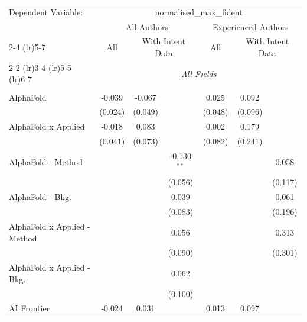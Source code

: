 \begingroup
\centering
\begin{tabular}{lcccccc}
   \tabularnewline \midrule \midrule
   Dependent Variable: & \multicolumn{6}{c}{normalised\_max\_fident}\\
 & \multicolumn{3}{c}{All Authors} & \multicolumn{3}{c}{Experienced Authors} \\
\cmidrule(lr){2-4} \cmidrule(lr){5-7}
 & \multicolumn{1}{c}{All} & \multicolumn{2}{c}{With Intent Data} & \multicolumn{1}{c}{All} & \multicolumn{2}{c}{With Intent Data} \\
\cmidrule(lr){2-2} \cmidrule(lr){3-4} \cmidrule(lr){5-5} \cmidrule(lr){6-7}
 & \multicolumn{6}{c}{\textit{All Fields}} \\ \\
   AlphaFold                      & -0.039  & -0.067  &               & 0.025   & 0.092   &   \\   
                                  & (0.024) & (0.049) &               & (0.048) & (0.096) &   \\   
   AlphaFold x Applied            & -0.018  & 0.083   &               & 0.002   & 0.179   &   \\   
                                  & (0.041) & (0.073) &               & (0.082) & (0.241) &   \\   
   AlphaFold - Method             &         &         & -0.130$^{**}$ &         &         & 0.058\\   
                                  &         &         & (0.056)       &         &         & (0.117)\\   
   AlphaFold - Bkg.               &         &         & 0.039         &         &         & 0.061\\   
                                  &         &         & (0.083)       &         &         & (0.196)\\   
   AlphaFold x Applied - Method   &         &         & 0.056         &         &         & 0.313\\   
                                  &         &         & (0.090)       &         &         & (0.301)\\   
   AlphaFold x Applied - Bkg.     &         &         & 0.062         &         &         &   \\   
                                  &         &         & (0.100)       &         &         &   \\   
   AI Frontier                    & -0.024  & 0.031   &               & 0.013   & 0.097   &   \\   

\end{tabular}
